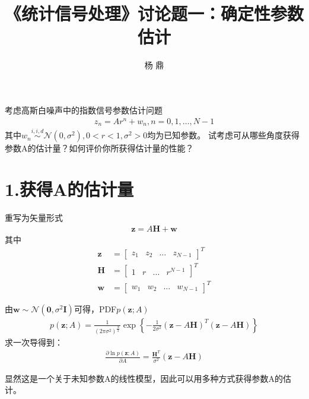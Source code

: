\documentclass[fontset=windows]{article}
\title{\heiti\zihao{2} 《统计信号处理》讨论题一：确定性参数估计}
\author{杨 鼎}
\date{}
\numberwithin{figure}{section}
\begin{document}
\maketitle
\thispagestyle{empty}



考虑高斯白噪声中的指数信号参数估计问题
\begin{align*}
    z_n=Ar^n+w_n,n=0,1,\dots,N-1
\end{align*}
其中\(w_n \overset{i,i,d}{\sim} \mathcal{N}(0,\sigma^2),0<r<1,\sigma^2>0\)均为已知参数。
试考虑可从哪些角度获得参数A的估计量？如何评价你所获得估计量的性能？
\section*{1.获得A的估计量}
重写为矢量形式
\begin{align*}
    \mathbf{z}=A\mathbf{H}+\mathbf{w}
\end{align*}
其中
\begin{align*}
    \mathbf{z} & =\begin{bmatrix}
        z_1 & z_2 & \dots & z_{N-1}
    \end{bmatrix}^T \\
    \mathbf{H} & =\begin{bmatrix}
        1 & r & \dots & r^{N-1}
    \end{bmatrix}^T \\
    \mathbf{w} & =\begin{bmatrix}
        w_1 & w_2 & \dots & w_{N-1}
    \end{bmatrix}^T
\end{align*}

由\(\mathbf{w} \sim \mathcal{N}(\mathbf{0},\sigma^2\mathbf{I})\)可得，PDF\(p(\mathbf{z};A)\)
\begin{align*}
    p(\mathbf{z};A)=\frac{1}{(2\pi \sigma^2)^{\frac{N}{2}}}
    \exp\left\{-\frac{1}{2\sigma^2}(\mathbf{z}-A\mathbf{H})^T(\mathbf{z}-A\mathbf{H})\right\}
\end{align*}
求一次导得到：
\begin{align*}
    \frac{\partial \ln p(\mathbf{z};A)}{\partial A}=\frac{\mathbf{H}^T}{\sigma^2}(\mathbf{z}-A\mathbf{H})
\end{align*}

显然这是一个关于未知参数A的线性模型，因此可以用多种方式获得参数A的估计。
\end{document}
